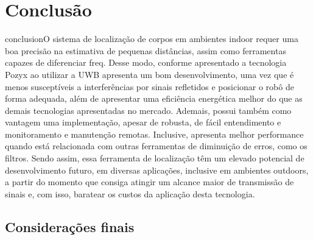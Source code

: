 \chapter{Conclusão}
\label{chap:conc}

conclusionO sistema de localização de corpos em ambientes indoor requer uma boa precisão na estimativa de pequenas distâncias, assim como ferramentas capazes de diferenciar freq. Desse modo, conforme apresentado a tecnologia Pozyx ao utilizar a UWB apresenta um bom desenvolvimento, uma vez que é menos susceptíveis a interferências por sinais refletidos e posicionar o robô de forma adequada, além de apresentar uma eficiência energética melhor do que as demais tecnologias apresentadas no mercado. Ademais, possui também como vantagem uma implementação, apesar de robusta, de fácil entendimento e monitoramento e manutenção remotas. Inclusive, apresenta melhor performance quando está relacionada com outras ferramentas de diminuição de erros, como os filtros. Sendo assim, essa ferramenta de localização têm um elevado potencial de desenvolvimento futuro, em diversas aplicações, inclusive em ambientes outdoors, a partir do momento que consiga atingir um alcance maior de transmissão de sinais e, com isso, baratear os custos da aplicação desta tecnologia.

\section{Considerações finais}
\label{sec:consid}



